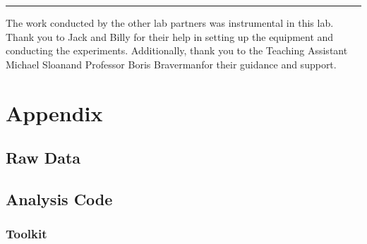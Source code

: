 \documentclass[aip, cp, amsmath, amssymb, reprint]{revtex4-2}
\newcommand\advname{Boris Braverman\space} %
\newcommand\taname{Michael Sloan\space} %
\begin{document}
    \onecolumngrid
    \begin{center}
        \vspace{0.8cm}
        \noindent\rule{0.9\textwidth}{0.5pt}
    \end{center}

    \begin{acknowledgments}
        The work conducted by the other lab partners was instrumental in this lab. Thank you to Jack and Billy for their help in setting up the equipment and conducting the experiments. Additionally, thank you to the Teaching Assistant \taname and Professor \advname for their guidance and support.
    \end{acknowledgments}



\appendix
\section{Appendix}
\subsection{Raw Data}

\subsection{Analysis Code}
\subsubsection{Toolkit}

\end{document}
